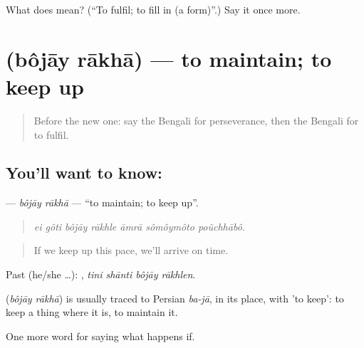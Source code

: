 \begin{tcolorbox}[breakable,colback=teal!4,colframe=teal!35!black,title={Before you move on}]
What does   mean? (\textquotedblleft{}To fulfil; to fill in (a form)\textquotedblright{}.) Say it once more.
\end{tcolorbox}
\section[\texorpdfstring{\bn{বজায়} \bn{রাখা} (bôjāy rākhā)}{বজায় রাখা (bôjāy rākhā)}]{  (bôjāy rākhā) — to maintain; to keep up}

\label{lesson:BN-C382-bojay-rakha}



\begin{quote}
Before the new one: say the Bengali for perseverance, then the Bengali for to fulfil.
\end{quote}

\subsection*{You'll want to know:  }
\textbf{ } — \emph{bôjāy rākhā} — \textquotedblleft{}to maintain; to keep up\textquotedblright{}.

\begin{quote}
      
\end{quote}

\begin{quote}
\emph{ei gôti bôjāy rākhle āmrā sômôymôto poũchhābô.}
\end{quote}

\begin{quote}
If we keep up this pace, we'll arrive on time.
\end{quote}

Past (he/she …):    , \emph{tini shānti bôjāy rākhlen}.

\begin{cousinweb}
\textbf{ } (\emph{bôjāy rākhā}) is usually traced to Persian \emph{ba-jā}, in its place, with  'to keep': to keep a thing where it is, to maintain it.
\end{cousinweb}

\begin{grammarlens}[title={What you've built}]
One more word for saying what happens if.
\end{grammarlens}

